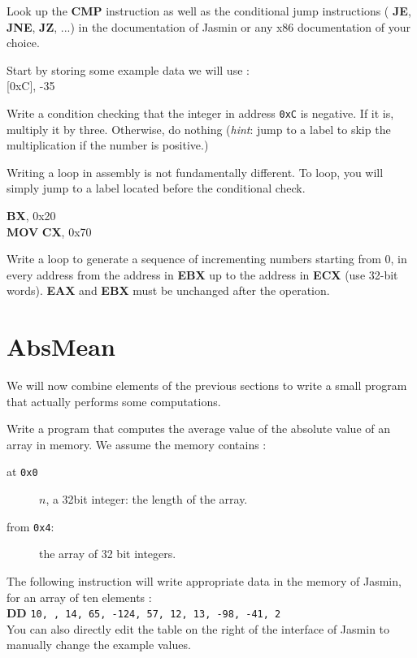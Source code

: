 \documentclass[a4paper]{article}
\newenvironment{instruction}%
{\vspace{15pt}
	\begin{Sbox}
		\begin{minipage}{\textwidth}}%
		{\end{minipage}
	\end{Sbox}	
\shadowbox{\TheSbox} \vspace{10pt}}
\newcommand{\asmop}[1]{{\sffamily \bfseries \color{asmblue} #1}}
\newcommand{\asmreg}[1]{{\sffamily \bfseries \color{asmgreen} #1}}
\begin{document}
Look up the \asmop{CMP} instruction as well as the conditional jump instructions (\asmop{JE}, \asmop{JNE}, \asmop{JZ}, ...) in the documentation of \textsf{Jasmin} or any x86 documentation of your choice.

\begin{instruction}
	
	Start by storing some example data we will use :\\
	
	{\ttfamily \asmop{MOV} [0xC], -35 \\}
	
	Write a condition checking that the integer in address \texttt{0xC} is negative. If it is, multiply it by three. Otherwise, do nothing (\emph{hint}: jump to a label to skip the multiplication if the number is positive.)

\end{instruction}


Writing a loop in assembly is not fundamentally different. To loop, you will simply jump to a label located before the conditional check.

\begin{instruction}
	
	{\ttfamily \asmop{MOV} \asmreg{BX}, 0x20 \\
		\asmop{MOV} \asmreg{CX}, 0x70 \\}	
	
Write a loop to generate a sequence of incrementing numbers 
starting from 0, in every address from the address in \asmreg{EBX} 
up to the address in \asmreg{ECX} (use 32-bit words).
\asmreg{EAX} and \asmreg{EBX} must be unchanged after the operation.
\end{instruction}


\section{AbsMean}

We will now combine elements of the previous sections to write a small program that actually performs some computations. 

\begin{instruction}

Write a program that computes the average value of the absolute value of an array in memory.  
We assume the memory contains :
\begin{description}
	\item[at \texttt{0x0}] $n$, a 32bit integer: the length of the array.
	\item[from \texttt{0x4}:] the array of 32 bit integers.
\end{description}
 	 
The following instruction will write appropriate data in the memory of \textsf{Jasmin}, for an array of ten elements : \\

\asmop{DD} \qquad \texttt{10, ,  14,  65, -124, 57, 12, 13, -98, -41, 2} \\
 
	  
You can also directly edit the table on the right of the interface of \textsf{Jasmin} to manually change the example values.
\end{instruction}
\end{document}
